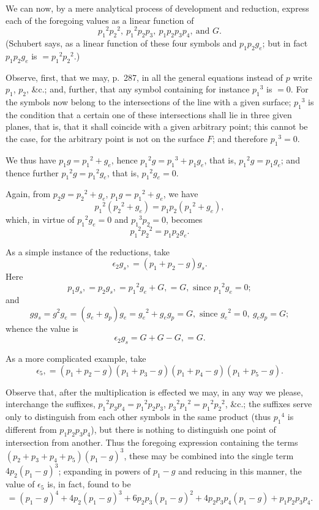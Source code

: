 \documentclass[11pt,a4paper,english]{article}
\theoremstyle{plain}
\begin{document}
\newpage
We can now, by a mere analytical process of development and reduction, express each of the foregoing values as a linear function of
\[
{p_1}^2{p_2}^2,\ {p_1}^2p_2p_3,\ p_1p_2p_3p_4,\ \text{and } G.
\]
(Schubert says, as a linear function of these four symbols and $p_1p_2g_e$; but in fact $p_1p_2g_e$ is $= {p_1}^2{p_2}^2$.)

Observe, first, that we may, p.\ 287, in all the general equations instead of $p$ write $p_1$, $p_2$, \&c.; and, further, that any symbol containing for instance ${p_1}^3$ is $= 0$. For the symbols now belong to the intersections of the line with a given surface; ${p_1}^3$ is the condition that a certain one of these intersections shall lie in three given planes, that is, that it shall coincide with a given arbitrary point; this cannot be the case, for the arbitrary point is not on the surface $F$; and therefore ${p_1}^3 = 0$.

We thus have $p_1g = {p_1}^2 + g_e$, hence ${p_1}^2g = {p_1}^3 + p_1g_e$, that is, ${p_1}^2g = p_1g_e$; and thence further ${p_1}^2g = {p_1}^2g_e$, that is, ${p_1}^2g_e = 0$.

Again, from $p_2g = {p_2}^2 + g_e$, $p_1g = {p_1}^2 + g_e$, we have
\[
{p_1}^2({p_2}^2 + g_e) = p_1p_2({p_1}^2 + g_e),
\]
which, in virtue of ${p_1}^2g_e = 0$ and ${p_1}^3p_2 = 0$, becomes
\[
{p_1}^2{p_2}^2 = p_1p_2g_e.
\]

As a simple instance of the reductions, take
\[
\epsilon_2 g_s, = (p_1 + p_2 - g)g_s.
\]
Here
\[
p_1g_s, = p_2g_s, = {p_1}^2g_e + G, = G, \text{ since } {p_1}^2g_e = 0;
\]
and
\[
gg_s = g^2g_e = (g_e + g_p)g_e = {g_e}^2 + g_eg_p = G, \text{ since } {g_e}^2 = 0,\ g_eg_p = G;
\]
whence the value is
\[
\epsilon_2 g_s = G + G - G, = G.
\]

As a more complicated example, take
\[
\epsilon_5, = (p_1 + p_2 - g)(p_1 + p_3 - g)(p_1 + p_4 - g)(p_1 + p_5 - g).
\]

Observe that, after the multiplication is effected we may, in any way we please, interchange the suffixes, ${p_1}^2p_3p_4 = {p_1}^2p_2p_3$, ${p_3}^2{p_1}^2 = {p_1}^2{p_2}^2$, \&c.; the suffixes serve only to distinguish from each other symbols in the same product (thus ${p_1}^4$ is different from $p_1p_2p_3p_4$), but there is nothing to distinguish one point of intersection from another. Thus the foregoing expression containing the terms $(p_2 + p_3 + p_4 + p_5)(p_1 - g)^3$, these may be combined into the single term $4p_2(p_1 - g)^3$; expanding in powers of $p_1 - g$ and reducing in this manner, the value of $\epsilon_5$ is, in fact, found to be
\[
= (p_1 - g)^4 + 4p_2(p_1 - g)^3 + 6p_2p_3(p_1 - g)^2 + 4p_2p_3p_4(p_1 - g) + p_1p_2p_3p_4.
\]
\end{document}
